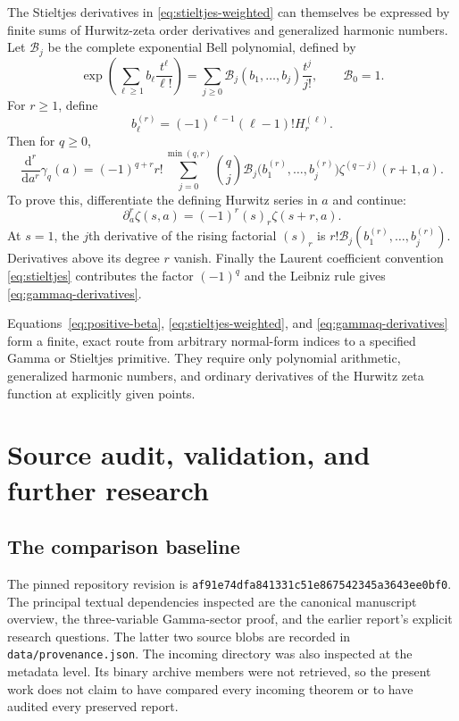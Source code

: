 \documentclass[11pt,letterpaper]{article}
\numberwithin{equation}{section}
\theoremstyle{plain}
\theoremstyle{definition}
\theoremstyle{remark}
\newcommand{\src}[1]{\nolinkurl{#1}}
\newcommand{\sourcecommit}{af91e74dfa841331c51e867542345a3643ee0bf0}
\begin{document}
The Stieltjes derivatives in \eqref{eq:stieltjes-weighted} can themselves be expressed by finite sums of Hurwitz-zeta order derivatives and generalized harmonic numbers. Let $\mathcal B_j$ be the complete exponential Bell polynomial, defined by
\[
 \exp\left(\sum_{\ell\ge1}b_\ell\frac{t^\ell}{\ell!}\right)
 =\sum_{j\ge0}\mathcal B_j(b_1,\ldots,b_j)\frac{t^j}{j!},
 \qquad \mathcal B_0=1.
\]
For $r\ge1$, define
\[
 b_\ell^{(r)}=(-1)^{\ell-1}(\ell-1)!H_r^{(\ell)}.
\]
Then for $q\ge0$,
\begin{equation}\label{eq:gammaq-derivatives}
 \frac{\mathrm d^r}{\mathrm da^r}\gamma_q(a)
 =(-1)^{q+r}r!\sum_{j=0}^{\min(q,r)}\binom qj
   \mathcal B_j\bigl(b_1^{(r)},\ldots,b_j^{(r)}\bigr)
   \zeta^{(q-j)}(r+1,a).
\end{equation}
To prove this, differentiate the defining Hurwitz series in $a$ and continue:
\[
 \partial_a^r\zeta(s,a)=(-1)^r(s)_r\zeta(s+r,a).
\]
At $s=1$, the $j$th derivative of the rising factorial $(s)_r$ is
$r!\mathcal B_j(b_1^{(r)},\ldots,b_j^{(r)})$. Derivatives above its degree $r$ vanish. Finally the Laurent coefficient convention \eqref{eq:stieltjes} contributes the factor $(-1)^q$ and the Leibniz rule gives \eqref{eq:gammaq-derivatives}.

Equations~\eqref{eq:positive-beta}, \eqref{eq:stieltjes-weighted}, and \eqref{eq:gammaq-derivatives} form a finite, exact route from arbitrary normal-form indices to a specified Gamma or Stieltjes primitive. They require only polynomial arithmetic, generalized harmonic numbers, and ordinary derivatives of the Hurwitz zeta function at explicitly given points.



\section{Source audit, validation, and further research}
\label{sec:audit}

\subsection{The comparison baseline}

The pinned repository revision is \texttt{\sourcecommit}. The principal textual dependencies inspected are the canonical manuscript overview, the three-variable Gamma-sector proof, and the earlier report's explicit research questions. The latter two source blobs are recorded in \src{data/provenance.json}. The incoming directory was also inspected at the metadata level. Its binary archive members were not retrieved, so the present work does not claim to have compared every incoming theorem or to have audited every preserved report.
\end{document}
